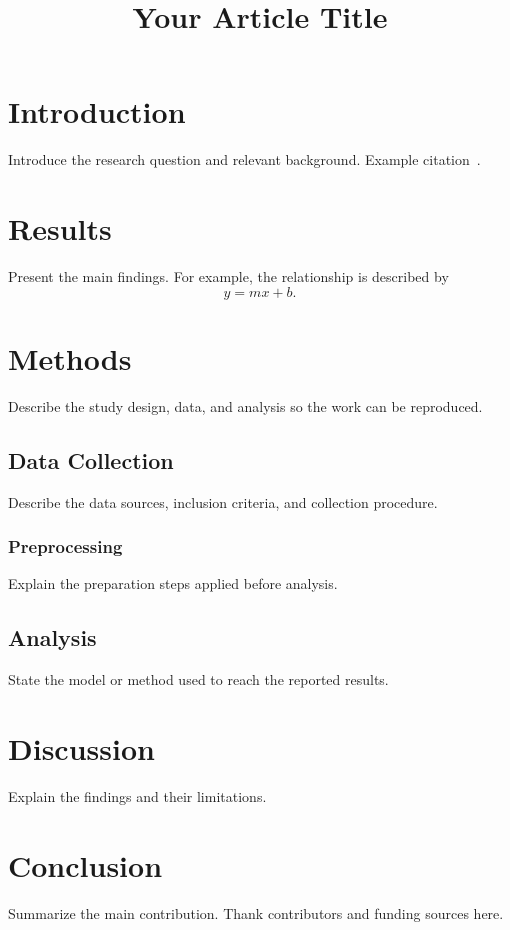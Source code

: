 \documentclass[pdflatex,sn-mathphys-num]{sn-jnl}
\begin{document}
\title[Short title]{Your Article Title}
\author*[1]{ }
\maketitle
\section{Introduction}\label{sec:intro}
Introduce the research question and relevant background. Example citation~\cite{einstein1905}.
\section{Results}\label{sec:results}
Present the main findings. For example, the relationship is described by
\begin{equation}
  y = mx + b.
\end{equation}
\section{Methods}\label{sec:methods}
Describe the study design, data, and analysis so the work can be reproduced.
\subsection{Data Collection}\label{subsec:data}
Describe the data sources, inclusion criteria, and collection procedure.
\subsubsection{Preprocessing}
Explain the preparation steps applied before analysis.
\subsection{Analysis}\label{subsec:analysis}
State the model or method used to reach the reported results.
\section{Discussion}\label{sec:discussion}
Explain the findings and their limitations.
\section{Conclusion}\label{sec:conclusion}
Summarize the main contribution.
\backmatter
{}
Thank contributors and funding sources here.

\end{document}
